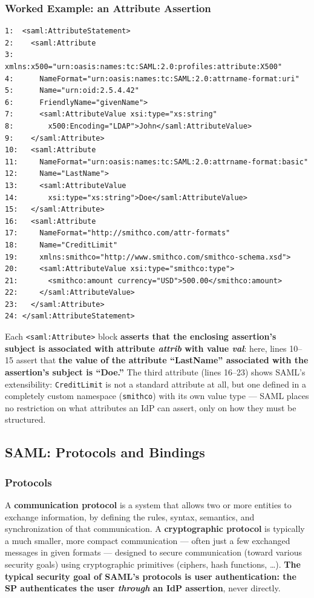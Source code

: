 \documentclass[12pt, a4paper]{article}
\begin{document}
\subsubsection{Worked Example: an Attribute Assertion}
\begin{verbatim}
1:  <saml:AttributeStatement>
2:    <saml:Attribute
3:      xmlns:x500="urn:oasis:names:tc:SAML:2.0:profiles:attribute:X500"
4:      NameFormat="urn:oasis:names:tc:SAML:2.0:attrname-format:uri"
5:      Name="urn:oid:2.5.4.42"
6:      FriendlyName="givenName">
7:      <saml:AttributeValue xsi:type="xs:string"
8:        x500:Encoding="LDAP">John</saml:AttributeValue>
9:    </saml:Attribute>
10:   <saml:Attribute
11:     NameFormat="urn:oasis:names:tc:SAML:2.0:attrname-format:basic"
12:     Name="LastName">
13:     <saml:AttributeValue
14:       xsi:type="xs:string">Doe</saml:AttributeValue>
15:   </saml:Attribute>
16:   <saml:Attribute
17:     NameFormat="http://smithco.com/attr-formats"
18:     Name="CreditLimit"
19:     xmlns:smithco="http://www.smithco.com/smithco-schema.xsd">
20:     <saml:AttributeValue xsi:type="smithco:type">
21:       <smithco:amount currency="USD">500.00</smithco:amount>
22:     </saml:AttributeValue>
23:   </saml:Attribute>
24: </saml:AttributeStatement>
\end{verbatim}
Each \texttt{<saml:Attribute>} block \textbf{asserts that the enclosing assertion's subject is associated with attribute \textit{attrib} with value \textit{val}}: here, lines 10--15 assert that \textbf{the value of the attribute ``LastName'' associated with the assertion's subject is ``Doe.''} The third attribute (lines 16--23) shows SAML's extensibility: \texttt{CreditLimit} is not a standard attribute at all, but one defined in a completely custom namespace (\texttt{smithco}) with its own value type --- SAML places no restriction on what attributes an IdP can assert, only on how they must be structured.

\subsection{SAML: Protocols and Bindings}

\subsubsection{Protocols}
A \textbf{communication protocol} is a system that allows two or more entities to exchange information, by defining the rules, syntax, semantics, and synchronization of that communication. A \textbf{cryptographic protocol} is typically a much smaller, more compact communication --- often just a few exchanged messages in given formats --- designed to secure communication (toward various security goals) using cryptographic primitives (ciphers, hash functions, \dots). \textcolor{blue!50!black}{\textbf{The typical security goal of SAML's protocols is user authentication: the SP authenticates the user \emph{through} an IdP assertion}}, never directly.
\end{document}
